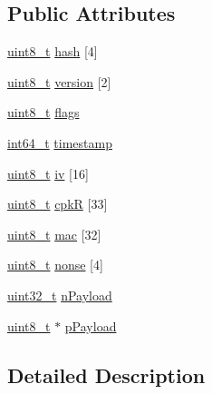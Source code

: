 \subsection*{Public Attributes}
\begin{DoxyCompactItemize}
\item 
\hyperlink{stdint_8h_aba7bc1797add20fe3efdf37ced1182c5}{uint8\+\_\+t} \hyperlink{class_secure_message_a922e818b7d08a351ccf6298fd8b9e312}{hash} \mbox{[}4\mbox{]}
\item 
\hyperlink{stdint_8h_aba7bc1797add20fe3efdf37ced1182c5}{uint8\+\_\+t} \hyperlink{class_secure_message_a13da5a2bfabeba96f2b0e8beafad4404}{version} \mbox{[}2\mbox{]}
\item 
\hyperlink{stdint_8h_aba7bc1797add20fe3efdf37ced1182c5}{uint8\+\_\+t} \hyperlink{class_secure_message_a753fd0eac0696882e5a7775e3d56604c}{flags}
\item 
\hyperlink{stdint_8h_adec1df1b8b51cb32b77e5b86fff46471}{int64\+\_\+t} \hyperlink{class_secure_message_abcacba8fbdcf20ff354e00dda9c9fec1}{timestamp}
\item 
\hyperlink{stdint_8h_aba7bc1797add20fe3efdf37ced1182c5}{uint8\+\_\+t} \hyperlink{class_secure_message_ad6f6a76b680f346e4738e40a52479b17}{iv} \mbox{[}16\mbox{]}
\item 
\hyperlink{stdint_8h_aba7bc1797add20fe3efdf37ced1182c5}{uint8\+\_\+t} \hyperlink{class_secure_message_a1618e9f53a94ac57bcbbdeaa06dedda4}{cpk\+R} \mbox{[}33\mbox{]}
\item 
\hyperlink{stdint_8h_aba7bc1797add20fe3efdf37ced1182c5}{uint8\+\_\+t} \hyperlink{class_secure_message_abf74073a4e3cab2ee76868c4aa5f3641}{mac} \mbox{[}32\mbox{]}
\item 
\hyperlink{stdint_8h_aba7bc1797add20fe3efdf37ced1182c5}{uint8\+\_\+t} \hyperlink{class_secure_message_a0b7fff6595961810d258de2b06cd1854}{nonse} \mbox{[}4\mbox{]}
\item 
\hyperlink{stdint_8h_a435d1572bf3f880d55459d9805097f62}{uint32\+\_\+t} \hyperlink{class_secure_message_a438e4c877867ad7b09768bb1ab047555}{n\+Payload}
\item 
\hyperlink{stdint_8h_aba7bc1797add20fe3efdf37ced1182c5}{uint8\+\_\+t} $\ast$ \hyperlink{class_secure_message_a2602ff454315ad14c6576008c1b0c333}{p\+Payload}
\end{DoxyCompactItemize}


\subsection{Detailed Description}


